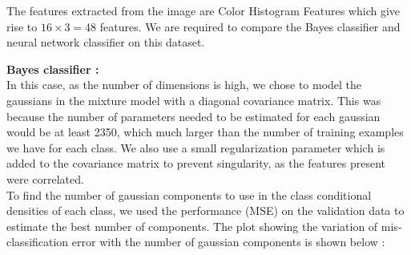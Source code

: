 \documentclass{article}
\begin{document}
The features extracted from the image are Color Histogram Features which give rise to $16 \times 3 = 48$ features.  We are required to compare the Bayes classifier and neural network classifier on this dataset.


\begin{flushleft}

\textbf{Bayes classifier :} \\[10pt]

In this case, as the number of dimensions is high, we chose to model the gaussians in the  mixture model with a diagonal covariance matrix. This was because the number of parameters needed to be estimated for each gaussian would be at least 2350, which much larger than the number of training examples we have for each class. We also use a small regularization parameter which is added to the covariance matrix to prevent singularity, as the features present were correlated. \\[10pt]


To find the number of gaussian components to use in the class conditional densities of each class, we used the performance (MSE) on the validation data to estimate the best number of components. The plot showing the variation of mis-classification error with the number of gaussian components is shown below :

\end{flushleft}
\end{document}
